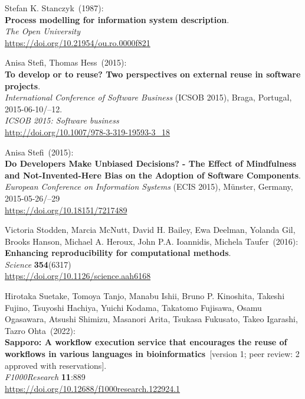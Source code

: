 \begin{thebibliography}{9}
Stefan K. Stanczyk~(1987): \\
\textbf{Process modelling for information system description}.\\
\emph{The Open University} \\
\url{https://doi.org/10.21954/ou.ro.0000f821}

Anisa Stefi, Thomas Hess~(2015): \\
\textbf{To develop or to reuse? Two perspectives on external reuse in software projects}. \\
\emph{International Conference of Software Business} (ICSOB 2015), Braga, Portugal, 2015-06-10/--12.\\
\emph{ICSOB 2015: Software business} \\
\url{http://doi.org/10.1007/978-3-319-19593-3_18}

Anisa Stefi~(2015): \\
\textbf{Do Developers Make Unbiased Decisions? - The Effect of Mindfulness and Not-Invented-Here Bias on the Adoption of Software Components}. \\
\emph{European Conference on Information Systems} (ECIS 2015), Münster, Germany, 2015-05-26/--29 \\
\url{https://doi.org/10.18151/7217489}

Victoria Stodden, Marcia McNutt, David H. Bailey, Ewa Deelman,
Yolanda Gil, Brooks Hanson, Michael A. Heroux, John P.A. Ioannidis,
Michela Taufer~(2016): \\
\textbf{Enhancing reproducibility for computational methods}.\\
\emph{Science} \textbf{354}(6317) \\
\url{https://doi.org/10.1126/science.aah6168}

Hirotaka Suetake, Tomoya Tanjo, Manabu Ishii, Bruno
P. Kinoshita, Takeshi Fujino, Tsuyoshi Hachiya, Yuichi Kodama, Takatomo
Fujisawa, Osamu Ogasawara, Atsushi Shimizu, Masanori Arita, Tsukasa
Fukusato, Takeo Igarashi, Tazro Ohta~(2022): \\
\textbf{Sapporo: A workflow execution service that encourages the reuse
of workflows in various languages in bioinformatics}~[version 1; peer review: 2 approved with reservations].\\
\emph{F1000Research} \textbf{11}:889\\
\url{https://doi.org/10.12688/f1000research.122924.1}


\end{thebibliography}
